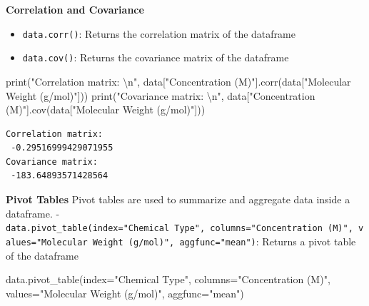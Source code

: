 \documentclass[
  letterpaper,
  DIV=11,
  numbers=noendperiod]{scrreprt}
\newenvironment{Shaded}{\begin{snugshade}}{\end{snugshade}}
\newcommand{\BuiltInTok}[1]{\textcolor[rgb]{0.00,0.23,0.31}{#1}}
\newcommand{\CharTok}[1]{\textcolor[rgb]{0.13,0.47,0.30}{#1}}
\newcommand{\NormalTok}[1]{\textcolor[rgb]{0.00,0.23,0.31}{#1}}
\newcommand{\OperatorTok}[1]{\textcolor[rgb]{0.37,0.37,0.37}{#1}}
\newcommand{\StringTok}[1]{\textcolor[rgb]{0.13,0.47,0.30}{#1}}
\providecommand{\tightlist}{%
  \setlength{\itemsep}{0pt}\setlength{\parskip}{0pt}}\usepackage{longtable,booktabs,array}
\begin{document}
\textbf{Correlation and Covariance}

\begin{itemize}
\tightlist
\item
  \texttt{data.corr()}: Returns the correlation matrix of the dataframe
\item
  \texttt{data.cov()}: Returns the covariance matrix of the dataframe
\end{itemize}

\begin{Shaded}
\begin{Highlighting}[]
\BuiltInTok{print}\NormalTok{(}\StringTok{"Correlation matrix: }\CharTok{\textbackslash{}n}\StringTok{"}\NormalTok{, data[}\StringTok{"Concentration (M)"}\NormalTok{].corr(data[}\StringTok{"Molecular Weight (g/mol)"}\NormalTok{]))}
\BuiltInTok{print}\NormalTok{(}\StringTok{"Covariance matrix: }\CharTok{\textbackslash{}n}\StringTok{"}\NormalTok{, data[}\StringTok{"Concentration (M)"}\NormalTok{].cov(data[}\StringTok{"Molecular Weight (g/mol)"}\NormalTok{]))}
\end{Highlighting}
\end{Shaded}

\begin{verbatim}
Correlation matrix: 
 -0.29516999429071955
Covariance matrix: 
 -183.64893571428564
\end{verbatim}

\textbf{Pivot Tables} Pivot tables are used to summarize and aggregate
data inside a dataframe. -
\texttt{data.pivot\_table(index="Chemical\ Type",\ columns="Concentration\ (M)",\ values="Molecular\ Weight\ (g/mol)",\ aggfunc="mean")}:
Returns a pivot table of the dataframe

\begin{Shaded}
\begin{Highlighting}[]
\NormalTok{data.pivot\_table(index}\OperatorTok{=}\StringTok{"Chemical Type"}\NormalTok{, columns}\OperatorTok{=}\StringTok{"Concentration (M)"}\NormalTok{, values}\OperatorTok{=}\StringTok{"Molecular Weight (g/mol)"}\NormalTok{, aggfunc}\OperatorTok{=}\StringTok{"mean"}\NormalTok{)}
\end{Highlighting}
\end{Shaded}
\end{document}
